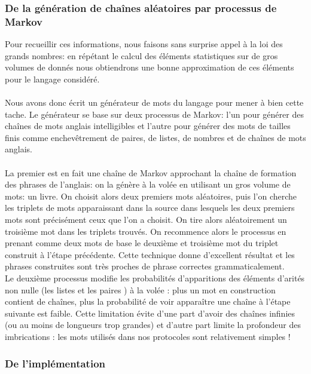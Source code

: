 \documentclass[11pt]{article} %
\begin{document}
\subsubsection{De la génération de chaînes aléatoires par processus de Markov}

    Pour recueillir ces informations, nous faisons sans surprise appel à la loi des grands nombres: en répétant le calcul des éléments statistiques sur de gros volumes de donnés nous obtiendrons une bonne approximation de ces éléments pour le langage considéré. \\\\

     Nous avons donc écrit un générateur de mots du langage pour mener à bien cette tache. Le générateur se base sur deux processus de Markov: l'un pour générer des chaînes de mots anglais intelligibles et l'autre pour générer des mots de tailles finis comme enchevêtrement de paires, de listes, de nombres et de chaînes de mots anglais. \\\\

    La premier est en fait une chaîne de Markov approchant la chaîne de formation des phrases de l'anglais: on la génère à la volée en utilisant un gros volume de mots: un livre. On choisit alors deux premiers mots aléatoires, puis l'on cherche les triplets de mots apparaissant dans la source dans lesquels les deux premiers mots sont précisément ceux que l'on a choisit. On tire alors aléatoirement un troisième mot dans les triplets trouvés. On recommence alors le processus en prenant comme deux mots de base le deuxième et troisième mot du triplet construit à l'étape précédente. Cette technique donne d'excellent résultat et les phrases construites sont très proches de phrase correctes grammaticalement. \\

    Le deuxième processus modifie les probabilités d'apparitions des éléments d'arités non nulle (les listes et les paires ) à la volée : plus un mot en construction contient de chaînes, plus la probabilité de voir apparaître une chaîne à l'étape suivante est faible.  Cette limitation évite d'une part d'avoir des chaînes infinies (ou au moins de longueurs trop grandes) et d'autre part limite la profondeur des imbrications : les mots utilisés dans nos protocoles sont relativement simples !


  \subsubsection{De l'implémentation}
\end{document}
